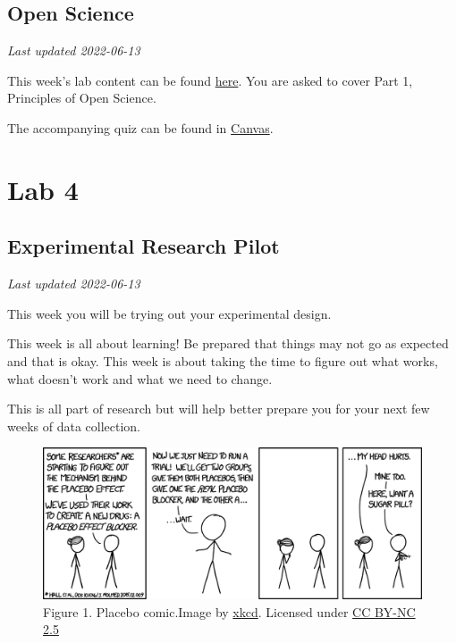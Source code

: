 \documentclass[
]{book}
\begin{document}
\hypertarget{open-science-1}{%
\chapter*{Open Science}\label{open-science-1}}

\emph{Last updated 2022-06-13}

This week's lab content can be found \href{https://ubco-biology.github.io/OS-Introduction/}{here}. You are asked to cover Part 1, Principles of Open Science.

The accompanying quiz can be found in \href{https://canvas.ubc.ca}{Canvas}.

\hypertarget{part-lab-4}{%
\part*{Lab 4}\label{part-lab-4}}

\hypertarget{experimental-research-pilot}{%
\chapter*{Experimental Research Pilot}\label{experimental-research-pilot}}

\emph{Last updated 2022-06-13}

This week you will be trying out your experimental design.

This week is all about learning! Be prepared that things may not go as expected and that is okay. This week is about taking the time to figure out what works, what doesn't work and what we need to change.

This is all part of research but will help better prepare you for your next few weeks of data collection.

\begin{figure}
\centering
\includegraphics{figures_images/Lab4-Fig1.png}
\caption{Figure 1. Placebo comic.Image by \href{https://xkcd.com/1526/}{xkcd}. Licensed under \href{https://creativecommons.org/licenses/by-nc/2.5/}{CC BY-NC 2.5}}
\end{figure}
\end{document}
